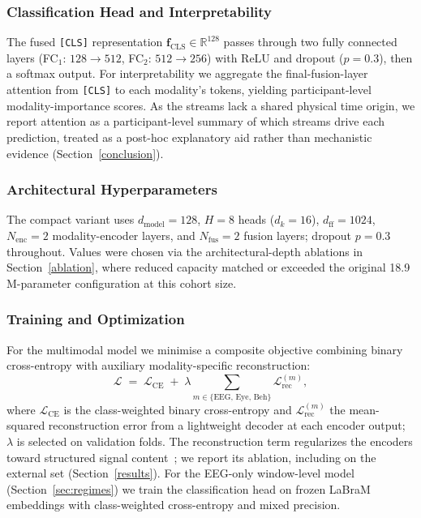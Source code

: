 \subsubsection{Classification Head and Interpretability}
The fused \texttt{[CLS]} representation $\mathbf{f}_{\text{CLS}} \in \mathbb{R}^{128}$
passes through two fully connected layers (FC$_1$: $128 \to 512$, FC$_2$:
$512 \to 256$) with ReLU and dropout ($p = 0.3$), then a softmax output. For
interpretability we aggregate the final-fusion-layer attention from \texttt{[CLS]} to
each modality's tokens, yielding participant-level modality-importance scores. As the
streams lack a shared physical time origin, we report attention as a participant-level
summary of which streams drive each prediction, treated as a post-hoc explanatory aid
rather than mechanistic evidence (Section~\ref{conclusion}).

\subsubsection{Architectural Hyperparameters}
The compact variant uses $d_{\text{model}} = 128$, $H = 8$ heads ($d_k = 16$),
$d_{\text{ff}} = 1024$, $N_{\text{enc}} = 2$ modality-encoder layers, and
$N_{\text{fus}} = 2$ fusion layers; dropout $p = 0.3$ throughout. Values were chosen
via the architectural-depth ablations in Section~\ref{ablation}, where reduced
capacity matched or exceeded the original 18.9\,M-parameter configuration at this
cohort size.

\subsubsection{Training and Optimization}
For the multimodal model we minimise a composite objective combining binary
cross-entropy with auxiliary modality-specific reconstruction:
\begin{equation}
\mathcal{L} \;=\; \mathcal{L}_{\text{CE}} \;+\; \lambda \!\!\sum_{m \in \{\text{EEG},\,\text{Eye},\,\text{Beh}\}}\!\! \mathcal{L}_{\text{rec}}^{(m)},
\end{equation}
where $\mathcal{L}_{\text{CE}}$ is the class-weighted binary cross-entropy and
$\mathcal{L}_{\text{rec}}^{(m)}$ the mean-squared reconstruction error from a
lightweight decoder at each encoder output; $\lambda$ is selected on validation
folds. The reconstruction term regularizes the encoders toward structured signal
content~\cite{Vincent2008}; we report its ablation, including on the external set
(Section~\ref{results}). For the EEG-only window-level model
(Section~\ref{sec:regimes}) we train the classification head on frozen LaBraM
embeddings with class-weighted cross-entropy and mixed precision.

